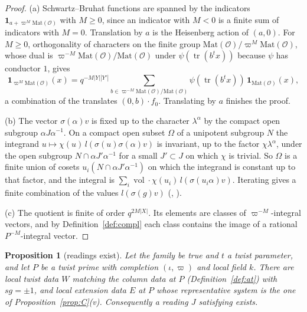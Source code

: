 \documentclass[11pt]{article}
\newcommand{\Ok}{\mathcal O}
\newcommand{\Mat}{\mathrm{Mat}}
\newcommand{\vol}{\operatorname{vol}}
\newtheorem{proposition}[theorem]{Proposition}
\theoremstyle{definition}
\theoremstyle{remark}
\begin{document}
\begin{proof}
(a) Schwartz--Bruhat functions are spanned by the indicators $\mathbf 1_{a+\varpi^{M}\Mat(\Ok)}$ with $M\ge0$, since an indicator with $M<0$ is a finite sum of indicators with $M=0$. Translation by $a$ is the Heisenberg action of $(a,0)$. For $M\ge0$, orthogonality of characters on the finite group $\Mat(\Ok)/\varpi^{M}\Mat(\Ok)$, whose dual is $\varpi^{-M}\Mat(\Ok)/\Mat(\Ok)$ under $\psi(\operatorname{tr}(b^tx))$ because $\psi$ has conductor $1$, gives
\[
\mathbf 1_{\varpi^{M}\Mat(\Ok)}(x)=q^{-M|Y||Y'|}\sum_{b\in\varpi^{-M}\Mat(\Ok)/\Mat(\Ok)}\psi(\operatorname{tr}(b^{t}x))\,\mathbf 1_{\Mat(\Ok)}(x),
\]
a combination of the translates $(0,b)\cdot f_0$. Translating by $a$ finishes the proof.

(b) The vector $\sigma(\alpha)v$ is fixed up to the character $\lambda^{\alpha}$ by the compact open subgroup $\alpha J\alpha^{-1}$. On a compact open subset $\Omega$ of a unipotent subgroup $N$ the integrand $u\mapsto\chi(u)\,l(\sigma(u)\sigma(\alpha)v)$ is invariant, up to the factor $\chi\lambda^{\alpha}$, under the open subgroup $N\cap\alpha J'\alpha^{-1}$ for a small $J'\subset J$ on which $\chi$ is trivial. So $\Omega$ is a finite union of cosets $u_i(N\cap\alpha J'\alpha^{-1})$ on which the integrand is constant up to that factor, and the integral is $\sum_i\vol\cdot\chi(u_i)\,l(\sigma(u_i\alpha)v)$. Iterating gives a finite combination of the values $l(\sigma(g)v)$ (, ).

(c) The quotient is finite of order $q^{2M|X|}$. Its elements are classes of $\varpi^{-M}$-integral vectors, and by Definition~\ref{def:compl} each class contains the image of a rational $P^{-M}$-integral vector.
\end{proof}

\begin{proposition}[readings exist]\label{prop:R}
Let the family be true and $t$ a twist parameter, and let $P$ be a twist prime with completion $(\iota,\varpi)$ and local field $k$. There are local twist data $W$ matching the column data at $P$ (Definition~\ref{def:at}) with $sg=\pm1$, and local extension data $E$ at $P$ whose representative system is the one of Proposition~\ref{prop:C}(v). Consequently a reading $J$ satisfying  exists.
\end{proposition}
\end{document}
